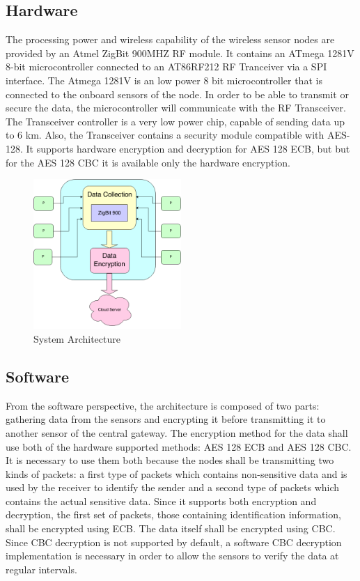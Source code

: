 \label{chap:arch}
\subsection{Hardware}

The processing power and wireless capability of the wireless sensor nodes are provided by an Atmel
ZigBit 900MHZ RF module. It contains an ATmega 1281V 8-bit microcontroller connected to an
AT86RF212 RF Tranceiver via a SPI interface. The Atmega 1281V is an low power 8 bit microcontroller
that is connected to the onboard sensors of the node. In order to be able to transmit or secure the
data, the microcontroller will communicate with the RF Transceiver. The Transceiver controller is a very low power chip,
capable of sending data up to 6 km. Also, the Transceiver contains a security module compatible
with AES-128. It supports hardware encryption and decryption for AES 128 ECB, but but for the AES
128 CBC it is available only the hardware encryption.


\begin{figure}[ht] \centering
  \includegraphics[width=0.5\textwidth]{img/wsn-soa-system-arch.png}
  \caption{System Architecture}
\end{figure}

\subsection{Software}

From the software perspective, the architecture is composed of two parts: gathering data from the sensors and encrypting it before transmitting it to another sensor of the central gateway.
The encryption method for the data shall use both of the hardware supported methods: AES 128 ECB
and AES 128 CBC. It is necessary to use them both because the nodes shall be transmitting 
two kinds of packets: a first type of packets which contains non-sensitive data and is used by the
receiver to identify the sender and a second type of packets which contains the actual sensitive data. Since it supports 
both encryption and decryption, the first set of packets, those containing identification information, shall be encrypted using ECB. The data itself shall be encrypted using CBC. Since CBC 
decryption is not supported by default, a software CBC decryption implementation is necessary in order to allow the sensors to verify the data at regular intervals.

